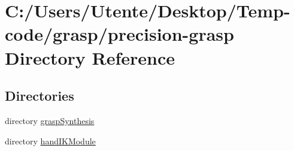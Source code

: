 \section{C\+:/\+Users/\+Utente/\+Desktop/\+Temp-\/code/grasp/precision-\/grasp Directory Reference}
\label{dir_6bbd02e879a3e965331ff927b180830c}
\subsection*{Directories}
\begin{DoxyCompactItemize}
\item 
directory \hyperlink{dir_250bb180ed40927d0f5c08cd48ecf7d2}{grasp\+Synthesis}
\item 
directory \hyperlink{dir_cfd7e4976c9885418815f8c2073b9880}{hand\+I\+K\+Module}
\end{DoxyCompactItemize}
